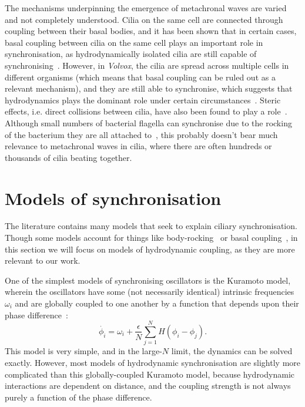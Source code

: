 The mechanisms underpinning the emergence of metachronal waves are varied and not completely understood. Cilia on the same cell are connected through coupling between their basal bodies, and it has been shown that in certain cases, basal coupling between cilia on the same cell plays an important role in synchronisation, as hydrodynamically isolated cilia are still capable of synchronising~. However, in \textit{Volvox}, the cilia are spread across multiple cells in different organisms (which means that basal coupling can be ruled out as a relevant mechanism), and they are still able to synchronise, which suggests that hydrodynamics plays the dominant role under certain circumstances~. Steric effects, i.e. direct collisions between cilia, have also been found to play a role~. Although small numbers of bacterial flagella can synchronise due to the rocking of the bacterium they are all attached to~, this probably doesn't bear much relevance to metachronal waves in cilia, where there are often hundreds or thousands of cilia beating together.

\section{Models of synchronisation}

The literature contains many models that seek to explain ciliary synchronisation. Though some models account for things like body-rocking~\cite{geyer_cell-body_2013} or basal coupling~, in this section we will focus on models of hydrodynamic coupling, as they are more relevant to our work.

One of the simplest models of synchronising oscillators is the Kuramoto model, wherein the oscillators have some (not necessarily identical) intrinsic frequencies $\omega_i$ and are globally coupled to one another by a function that depends upon their phase difference~:
\begin{equation}
    \dot{\phi_i} = \omega_i + \frac{\epsilon}{N} \sum_{j=1}^N H(\phi_i - \phi_j).
\end{equation}
This model is very simple, and in the large-$N$ limit, the dynamics can be solved exactly. However, most models of hydrodynamic synchronisation are slightly more complicated than this globally-coupled Kuramoto model, because hydrodynamic interactions are dependent on distance, and the coupling strength is not always purely a function of the phase difference.

